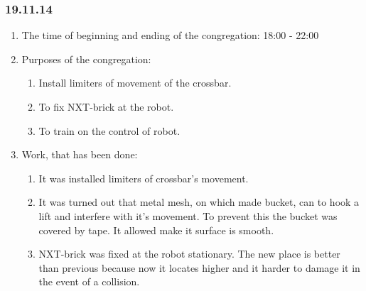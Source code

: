 \subsubsection{19.11.14}

\begin{enumerate}
	\item The time of beginning and ending of the congregation:
	18:00 - 22:00
	\item Purposes of the congregation:
	\begin{enumerate}
	  \item Install limiters of movement of the crossbar.
	  
	  \item To fix NXT-brick at the robot.
	  
	  \item To train on the control of robot.
	  
    \end{enumerate}
	\item Work, that has been done:
	\begin{enumerate}
	  \item It was installed limiters of crossbar's movement.
	  

      \item It was turned out that metal mesh, on which made bucket, can to hook a lift and interfere with it's movement. To prevent this the bucket was covered by tape. It allowed make it surface is smooth.
      
      \item NXT-brick was fixed at the robot stationary. The new place is better than previous because now it locates higher and it harder to damage it in the event of a collision.
      

\end{enumerate}
\end{enumerate}
